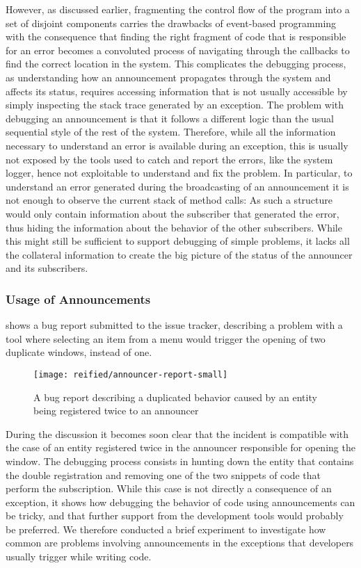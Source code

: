 However, as discussed earlier, fragmenting the control flow of the program into a set of disjoint components carries the drawbacks of event-based programming with the consequence that finding the right fragment of code that is responsible for an error becomes a convoluted process of navigating through the callbacks to find the correct location in the system.
This complicates the debugging process, as understanding how an announcement propagates through the system and affects its status, requires accessing information that is not usually accessible by simply inspecting the stack trace generated by an exception.
The problem with debugging an announcement is that it follows a different logic than the usual sequential style of the rest of the system.
Therefore, while all the information necessary to understand an error is available during an exception, this is usually not exposed by the tools used to catch and report the errors, like the system logger, hence not exploitable to understand and fix the problem.
In particular, to understand an error generated during the broadcasting of an announcement it is not enough to observe the current stack of method calls: As such a structure would only contain information about the subscriber that generated the error, thus hiding the information about the behavior of the other subscribers.
While this might still be sufficient to support debugging of simple problems, it lacks all the collateral information to create the big picture of the status of the announcer and its subscribers.


\subsubsection{Usage of Announcements}

 shows a bug report submitted to the \pha issue tracker, describing a problem with a tool where selecting an item from a menu would trigger the opening of two duplicate windows, instead of one.

\begin{figure}[t]
  \centering
  \texttt{[image: reified/announcer-report-small]}
  \caption[A bug report describing a duplicated behavior]{A bug report describing a duplicated behavior caused by an entity being registered twice to an announcer}
  \label{fig:announcer-report}
\end{figure}

During the discussion it becomes soon clear that the incident is compatible with the case of an entity registered twice in the announcer responsible for opening the window.
The debugging process consists in hunting down the entity that contains the double registration and removing one of the two snippets of code that perform the subscription.
While this case is not directly a consequence of an exception, it shows how debugging the behavior of code using announcements can be tricky, and that further support from the development tools would probably be preferred.
We therefore conducted a brief experiment to investigate how common are problems involving announcements in the exceptions that developers usually trigger while writing code.

